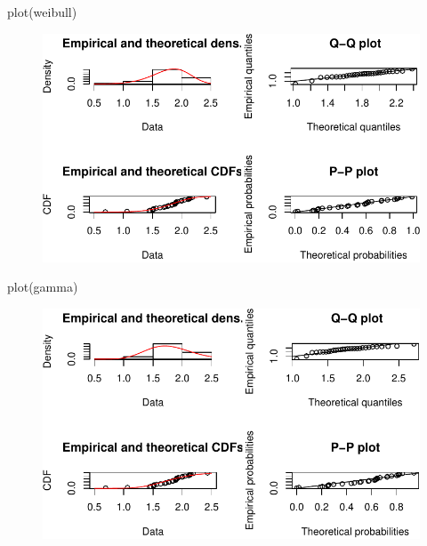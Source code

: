 \documentclass[
  letterpaper,
  DIV=11,
  numbers=noendperiod]{scrartcl}
\newenvironment{Shaded}{\begin{snugshade}}{\end{snugshade}}
\newcommand{\FunctionTok}[1]{\textcolor[rgb]{0.28,0.35,0.67}{#1}}
\newcommand{\NormalTok}[1]{\textcolor[rgb]{0.00,0.23,0.31}{#1}}
\begin{document}
\begin{Shaded}
\begin{Highlighting}[]
\FunctionTok{plot}\NormalTok{(weibull)}
\end{Highlighting}
\end{Shaded}

\begin{figure}[H]

{\centering \includegraphics{quiz5_files/figure-pdf/unnamed-chunk-13-1.pdf}

}

\end{figure}

\begin{Shaded}
\begin{Highlighting}[]
\FunctionTok{plot}\NormalTok{(gamma)}
\end{Highlighting}
\end{Shaded}

\begin{figure}[H]

{\centering \includegraphics{quiz5_files/figure-pdf/unnamed-chunk-14-1.pdf}

}

\end{figure}
\end{document}
